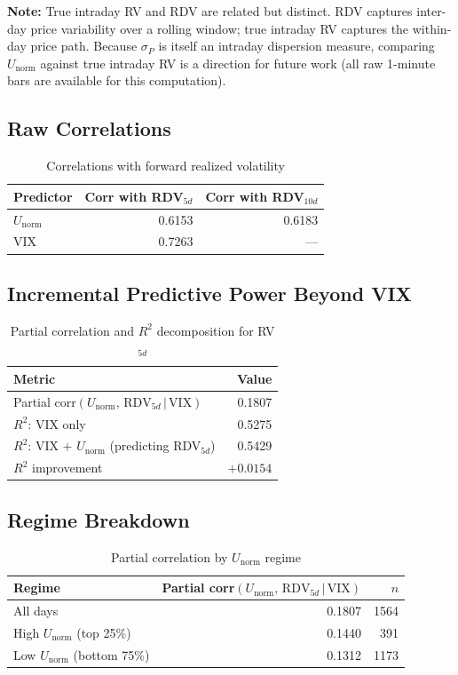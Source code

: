 \documentclass[preprint,12pt]{elsarticle}
\begin{document}
\textbf{Note:} True intraday RV and RDV are related but distinct. RDV captures inter-day price variability over a rolling window; true intraday RV captures the within-day price path. Because $\sigma_P$ is itself an intraday dispersion measure, comparing $U_\mathrm{norm}$ against true intraday RV is a direction for future work (all raw 1-minute bars are available for this computation).

\subsection{Raw Correlations}

\begin{table}[htbp]
\centering
\caption{Correlations with forward realized volatility}
\begin{tabular}{lrr}
\toprule
Predictor & Corr with RDV$_{5d}$ & Corr with RDV$_{10d}$ \\
\midrule
$U_\mathrm{norm}$ & 0.6153 & 0.6183 \\
VIX               & 0.7263 & --- \\
\bottomrule
\end{tabular}
\end{table}

\subsection{Incremental Predictive Power Beyond VIX}

\begin{table}[htbp]
\centering
\caption{Partial correlation and $R^2$ decomposition for RV$_{5d}$}
\begin{tabular}{lr}
\toprule
Metric & Value \\
\midrule
Partial corr$(U_\mathrm{norm},\, \mathrm{RDV}_{5d}\,|\,\mathrm{VIX})$ & 0.1807 \\
$R^2$: VIX only                & 0.5275 \\
$R^2$: VIX $+$ $U_\mathrm{norm}$ (predicting RDV$_{5d}$) & 0.5429 \\
$R^2$ improvement              & $+0.0154$ \\
\bottomrule
\end{tabular}
\end{table}

\subsection{Regime Breakdown}

\begin{table}[htbp]
\centering
\caption{Partial correlation by $U_\mathrm{norm}$ regime}
\begin{tabular}{lrr}
\toprule
Regime & Partial corr$(U_\mathrm{norm},\, \mathrm{RDV}_{5d}\,|\,\mathrm{VIX})$ & $n$ \\
\midrule
All days                   & 0.1807 & 1564 \\
High $U_\mathrm{norm}$ (top 25\%)    & 0.1440 & 391 \\
Low $U_\mathrm{norm}$ (bottom 75\%)  & 0.1312 & 1173 \\
\bottomrule
\end{tabular}
\end{table}
\end{document}
